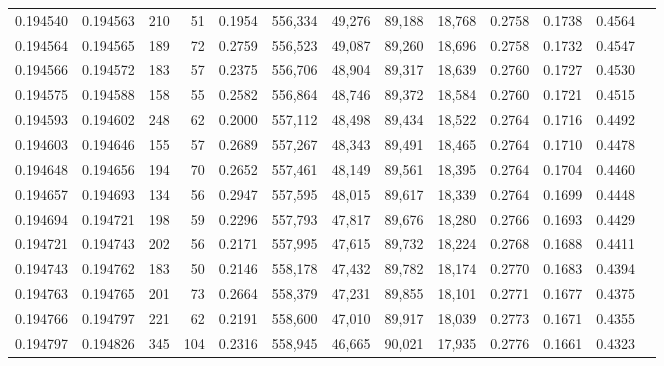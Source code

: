 \begin{tabular}{rrrrrrrrrrrrr}
0.194540 & 0.194563 &   210 &  51 &                                     0.1954 & 556,334 &  49,276 &  89,188 &  18,768 & 0.2758 & 0.1738 & 0.4564 \\
0.194564 & 0.194565 &   189 &  72 &                                     0.2759 & 556,523 &  49,087 &  89,260 &  18,696 & 0.2758 & 0.1732 & 0.4547 \\
0.194566 & 0.194572 &   183 &  57 &                                     0.2375 & 556,706 &  48,904 &  89,317 &  18,639 & 0.2760 & 0.1727 & 0.4530 \\
0.194575 & 0.194588 &   158 &  55 &                                     0.2582 & 556,864 &  48,746 &  89,372 &  18,584 & 0.2760 & 0.1721 & 0.4515 \\
0.194593 & 0.194602 &   248 &  62 &                                     0.2000 & 557,112 &  48,498 &  89,434 &  18,522 & 0.2764 & 0.1716 & 0.4492 \\
0.194603 & 0.194646 &   155 &  57 &                                     0.2689 & 557,267 &  48,343 &  89,491 &  18,465 & 0.2764 & 0.1710 & 0.4478 \\
0.194648 & 0.194656 &   194 &  70 &                                     0.2652 & 557,461 &  48,149 &  89,561 &  18,395 & 0.2764 & 0.1704 & 0.4460 \\
0.194657 & 0.194693 &   134 &  56 &                                     0.2947 & 557,595 &  48,015 &  89,617 &  18,339 & 0.2764 & 0.1699 & 0.4448 \\
0.194694 & 0.194721 &   198 &  59 &                                     0.2296 & 557,793 &  47,817 &  89,676 &  18,280 & 0.2766 & 0.1693 & 0.4429 \\
0.194721 & 0.194743 &   202 &  56 &                                     0.2171 & 557,995 &  47,615 &  89,732 &  18,224 & 0.2768 & 0.1688 & 0.4411 \\
0.194743 & 0.194762 &   183 &  50 &                                     0.2146 & 558,178 &  47,432 &  89,782 &  18,174 & 0.2770 & 0.1683 & 0.4394 \\
0.194763 & 0.194765 &   201 &  73 &                                     0.2664 & 558,379 &  47,231 &  89,855 &  18,101 & 0.2771 & 0.1677 & 0.4375 \\
0.194766 & 0.194797 &   221 &  62 &                                     0.2191 & 558,600 &  47,010 &  89,917 &  18,039 & 0.2773 & 0.1671 & 0.4355 \\
0.194797 & 0.194826 &   345 & 104 &                                     0.2316 & 558,945 &  46,665 &  90,021 &  17,935 & 0.2776 & 0.1661 & 0.4323 \\

\end{tabular}
